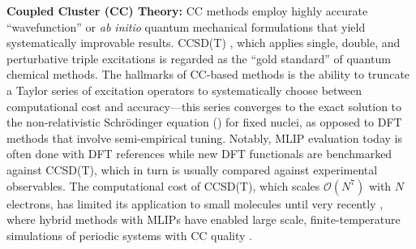 \textbf{Coupled Cluster (CC) Theory:} CC methods \citep{cizekCorrelationProblemAtomic1966} employ highly accurate ``wavefunction'' or \textit{ab initio} quantum mechanical formulations that yield systematically improvable results. CCSD(T) \citep{purvisFullCoupledclusterSingles1982}, which applies single, double, and perturbative triple excitations is regarded as the ``gold standard'' of quantum chemical methods. The hallmarks of CC-based methods is the ability to truncate a Taylor series of excitation operators to systematically choose between computational cost and accuracy---this series converges to the exact solution to the non-relativistic Schr\"{o}dinger equation () for fixed nuclei, as opposed to DFT methods that involve semi-empirical tuning. Notably, MLIP evaluation today is often done with DFT references while new DFT functionals are benchmarked against CCSD(T), which in turn is usually compared against experimental observables. The computational cost of CCSD(T), which scales $\mathcal{O}(N^7)$ with $N$ electrons, has limited its application to small molecules until very recently \citep{tang2024approaching}, where hybrid methods with MLIPs have enabled large scale, finite-temperature simulations of periodic systems with CC quality \citep{herzogCoupledClusterFinite2024}.


